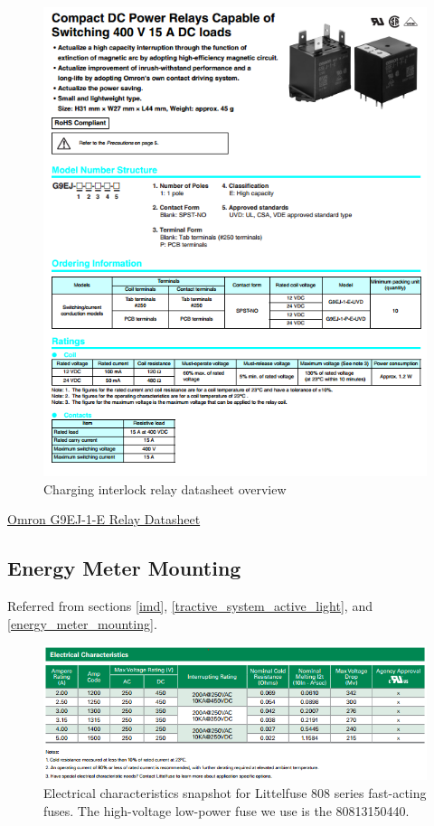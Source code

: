 \documentclass{article}
\begin{document}
\begin{figure}[H]
    \includegraphics[width=0.9\linewidth]{OmronG9EJ-1-E.png}
    \caption{Charging interlock relay datasheet overview} 
\end{figure}
\href{http://pdf1.alldatasheet.com/datasheet-pdf/view/826351/OMRON/G9EJ-1-E.html}{Omron G9EJ-1-E Relay Datasheet}

\subsection{Energy Meter Mounting}\label{appendix_energy_meter_mounting}
Referred from sections \ref{imd}, \ref{tractive_system_active_light}, and \ref{energy_meter_mounting}.

\begin{figure} [H]
	\centering  %
	\includegraphics[width=\textwidth]{Littelfuse_808_electrical_characteristics.png}
	\caption{Electrical characteristics snapshot for Littelfuse 808 series fast-acting fuses. The high-voltage low-power fuse we use is the 80813150440.}	
	\label{fig:littelfuse_808}
\end{figure}
\end{document}
